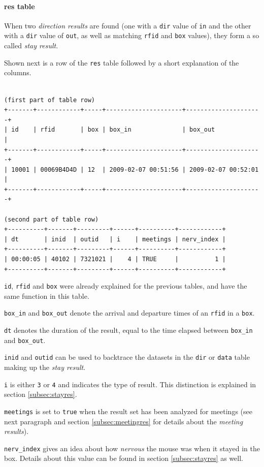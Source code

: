 \paragraph{res table}
\label{para:res_table}

When two \textit{direction results} are found (one with a \lstinline|dir| value of \lstinline|in| and the other with a \lstinline|dir| value of \lstinline|out|, as well as matching \lstinline|rfid| and \lstinline|box| values), they form a so called \textit{stay result}.

Shown next is a row of the \lstinline|res| table followed by a short explanation of the columns.

\codescript
{}
\begin{lstlisting}[frame=none]

(first part of table row)
+-------+------------+-----+---------------------+---------------------+
| id    | rfid       | box | box_in              | box_out             |
+-------+------------+-----+---------------------+---------------------+
| 10001 | 00069B4D4D | 12  | 2009-02-07 00:51:56 | 2009-02-07 00:52:01 |
+-------+------------+-----+---------------------+---------------------+

(second part of table row)
+----------+-------+---------+------+----------+------------+
| dt       | inid  | outid   | i    | meetings | nerv_index |
+----------+-------+---------+------+----------+------------+
| 00:00:05 | 40102 | 7321021 |    4 | TRUE     |          1 | 
+----------+-------+---------+------+----------+------------+

\end{lstlisting}

\begin{mydesc}
\item \lstinline|id|, \lstinline|rfid| and \lstinline|box| were already explained for the previous tables, and have the same function in this table.
\item \lstinline|box_in| and \lstinline|box_out| denote the arrival and departure times of an \lstinline|rfid| in a \lstinline|box|.
\item \lstinline|dt| denotes the duration of the result, equal to the time elapsed between \lstinline|box_in| and \lstinline|box_out|.
\item \lstinline|inid| and \lstinline|outid| can be used to backtrace the datasets in the \lstinline|dir| or \lstinline|data| table making up the \textit{stay result}.
\item \lstinline|i| is either \lstinline|3| or \lstinline|4| and indicates the type of result. This distinction is explained in section \ref{subsec:stayres}.
\item \lstinline|meetings| is set to \lstinline|true| when the result set has been analyzed for meetings (see next paragraph and section \ref{subsec:meetingres} for details about the \textit{meeting results}).
\item \lstinline|nerv_index| gives an idea about how \textit{nervous} the mouse was when it stayed in the box. Details about this value can be found in section \ref{subsec:stayres} as well.
\end{mydesc}

